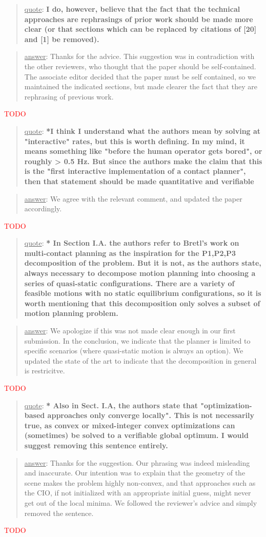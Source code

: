 \documentclass[a4paper]{article}
\newcommand{\ndone}[0]{\textcolor{red}{TODO}}
\newcommand\quot[1]{\begin{quote} \underline{quote}: \textbf{#1}\end{quote}}
\newcommand\as[1]{\begin{quote} \underline{answer}: {#1}\end{quote} }
\begin{document}
\quot{I do, however,
believe that the fact that the technical approaches are rephrasings of
prior work should be made more clear (or that sections which can be
replaced by citations of [20] and [1] be removed).}
\as{Thanks for the advice. This suggestion was in contradiction with the other reviewers, who thought that the paper should be self-contained.
The associate editor decided that the paper must be self contained, so we maintained the indicated sections, but made clearer the fact that they are rephrasing of previous work. }\ndone

\quot{*I think I understand what the authors mean by solving at
"interactive" rates, but this is worth defining. In my mind, it means
something like "before the human operator gets bored", or roughly > 0.5
Hz. But since the authors make the claim that this is the "first
interactive implementation of a contact planner", then that statement
should be made quantitative and verifiable}
\as{We agree with the relevant comment, and updated the paper accordingly.}\ndone

\quot{* In Section I.A. the authors refer to Bretl's work on multi-contact
planning as the inspiration for the P1,P2,P3 decomposition of the
problem. But it is not, as the authors state, always necessary to
decompose motion planning into choosing a series of quasi-static
configurations. There are a variety of feasible motions with no static
equilibrium configurations, so it is worth mentioning that this
decomposition only solves a subset of motion planning problem.}
\as{We apologize if this was not made clear enough in our first submission. In the conclusion, we indicate that the planner is limited to specific scenarios (where quasi-static motion
is always an option). We updated the state of the art to indicate that the decomposition in general is restricitve.}\ndone

\quot{* Also in Sect. I.A, the authors state that "optimization-based
approaches only converge locally". This is not necessarily true, as
convex or mixed-integer convex optimizations can (sometimes) be solved
to a verifiable global optimum. I would suggest removing this sentence
entirely.}
\as{Thanks for the suggestion. Our phrasing was indeed misleading and inaccurate. Our intention was to explain that the geometry of the scene makes the problem highly non-convex, and
that approaches such as the CIO, if not initialized with an appropriate initial guess, might never get out of the local minima. We followed the reviewer's advice and simply removed the sentence. }\ndone
\end{document}
